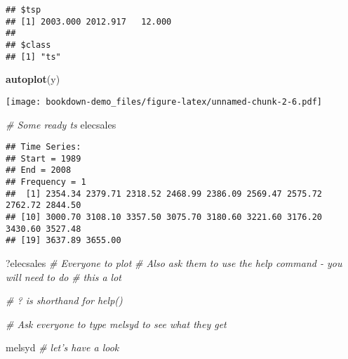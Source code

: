 \documentclass[]{book}
\newenvironment{Shaded}{\begin{snugshade}}{\end{snugshade}}
\newcommand{\CommentTok}[1]{\textcolor[rgb]{0.56,0.35,0.01}{\textit{#1}}}
\newcommand{\KeywordTok}[1]{\textcolor[rgb]{0.13,0.29,0.53}{\textbf{#1}}}
\newcommand{\NormalTok}[1]{#1}
\begin{document}
\begin{verbatim}
## $tsp
## [1] 2003.000 2012.917   12.000
## 
## $class
## [1] "ts"
\end{verbatim}

\begin{Shaded}
\begin{Highlighting}[]
  \KeywordTok{autoplot}\NormalTok{(y)}
\end{Highlighting}
\end{Shaded}

\texttt{[image: bookdown-demo\_files/figure-latex/unnamed-chunk-2-6.pdf]}

\begin{Shaded}
\begin{Highlighting}[]
  \CommentTok{# Some ready ts}
\NormalTok{  elecsales}
\end{Highlighting}
\end{Shaded}

\begin{verbatim}
## Time Series:
## Start = 1989 
## End = 2008 
## Frequency = 1 
##  [1] 2354.34 2379.71 2318.52 2468.99 2386.09 2569.47 2575.72 2762.72 2844.50
## [10] 3000.70 3108.10 3357.50 3075.70 3180.60 3221.60 3176.20 3430.60 3527.48
## [19] 3637.89 3655.00
\end{verbatim}

\begin{Shaded}
\begin{Highlighting}[]
\NormalTok{  ?elecsales}
  \CommentTok{# Everyone to plot}
  \CommentTok{# Also ask them to use the help command - you will need to do }
  \CommentTok{# this a lot}
  
  \CommentTok{# ? is shorthand for help()}
  
  \CommentTok{# Ask everyone to type melsyd to see what they get}
  
\NormalTok{  melsyd }\CommentTok{# let's have a look}
\end{Highlighting}
\end{Shaded}
\end{document}
